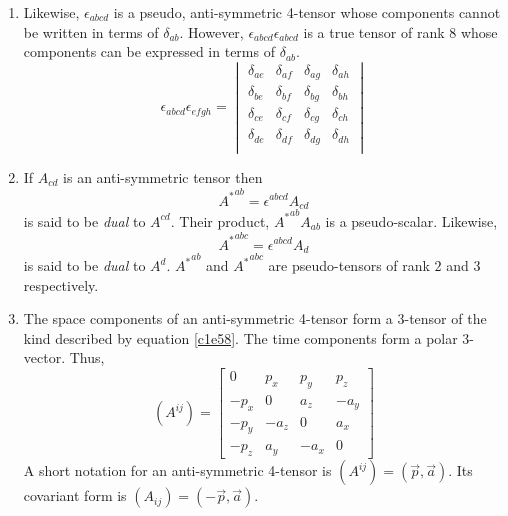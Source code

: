 \begin{enumerate}
\item Likewise, $\epsilon_{abcd}$ is a pseudo, anti-symmetric
4-tensor whose components cannot be written in terms of $\delta_{ab}$. However,
$\epsilon_{abcd}\epsilon_{abcd}$ is a true tensor
of rank $8$ whose components can be expressed in terms of $\delta_{ab}$.
\begin{equation}\label{c1e61}
\epsilon_{abcd}\epsilon_{efgh} = \begin{vmatrix}
\delta_{ae} & \delta_{af} & \delta_{ag} & \delta_{ah} \\
\delta_{be} & \delta_{bf} & \delta_{bg} & \delta_{bh} \\
\delta_{ce} & \delta_{cf} & \delta_{cg} & \delta_{ch} \\
\delta_{de} & \delta_{df} & \delta_{dg} & \delta_{dh} \\
\end{vmatrix}
\end{equation}

\item If $A_{cd}$ is an anti-symmetric tensor then
\begin{equation}\label{c1e62}
{A^\ast}^{ab} = \epsilon^{abcd}A_{cd}
\end{equation}
is said to be \emph{dual} to $A^{cd}$. Their product, ${A^\ast}^{ab}
A_{ab}$ is a pseudo-scalar. Likewise, 
\begin{equation}\label{c1e63}
{A^\ast}^{abc} = \epsilon^{abcd}A_{d}
\end{equation}
is said to be \emph{dual} to $A^d$. ${A^\ast}^{ab}$ and ${A^\ast}^{abc}$
are pseudo-tensors of rank $2$ and $3$ respectively.

\item The space components of an anti-symmetric 4-tensor form a 3-tensor of the 
kind described by equation \eqref{c1e58}. The time components form a polar 
3-vector. Thus,
\begin{equation}\label{c1e64}
(A^{ij}) = \begin{bmatrix} 0 & p_x & p_y & p_z \\
-p_x & 0 & a_z & -a_y \\
-p_y & -a_z & 0 & a_x \\
-p_z & a_y & -a_x & 0
\end{bmatrix}
\end{equation}
A short notation for an anti-symmetric 4-tensor is $(A^{ij}) = (\vec{p}, 
\vec{a})$.  Its covariant form is $(A_{ij}) = (-\vec{p}, \vec{a})$.


\end{enumerate}

